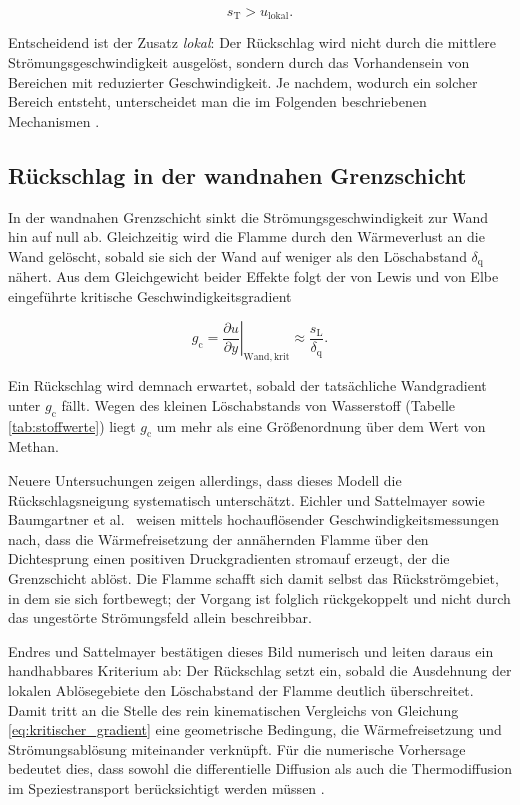 \begin{equation}
	\label{eq:flashback_bedingung}
	s_\mathrm{T} > u_\mathrm{lokal}.
\end{equation}

Entscheidend ist der Zusatz \emph{lokal}: Der Rückschlag wird nicht durch die
mittlere Strömungsgeschwindigkeit ausgelöst, sondern durch das Vorhandensein
von Bereichen mit reduzierter Geschwindigkeit. Je nachdem, wodurch ein solcher
Bereich entsteht, unterscheidet man die im Folgenden beschriebenen
Mechanismen \cite{Kalantari_2017, Lieuwen_2008}.

\subsection{Rückschlag in der wandnahen Grenzschicht}\label{subsec:blf}

In der wandnahen Grenzschicht sinkt die Strömungsgeschwindigkeit zur Wand hin
auf null ab. Gleichzeitig wird die Flamme durch den Wärmeverlust an die Wand
gelöscht, sobald sie sich der Wand auf weniger als den Löschabstand
$\delta_\mathrm{q}$ nähert. Aus dem Gleichgewicht beider Effekte folgt der von
Lewis und von Elbe eingeführte kritische Geschwindigkeitsgradient

\begin{equation}
	\label{eq:kritischer_gradient}
	g_\mathrm{c} = \left.\frac{\partial u}{\partial y}\right|_\mathrm{Wand,krit}
	\approx \frac{s_\mathrm{L}}{\delta_\mathrm{q}}.
\end{equation}

Ein Rückschlag wird demnach erwartet, sobald der tatsächliche Wandgradient
unter $g_\mathrm{c}$ fällt. Wegen des kleinen Löschabstands von Wasserstoff
(Tabelle \ref{tab:stoffwerte}) liegt $g_\mathrm{c}$ um mehr als eine
Größenordnung über dem Wert von Methan.

Neuere Untersuchungen zeigen allerdings, dass dieses Modell die
Rückschlagsneigung systematisch unterschätzt. Eichler und Sattelmayer
\cite{Eichler_2012} sowie Baumgartner et al.\ \cite{Baumgartner_2016} weisen
mittels hochauflösender Geschwindigkeitsmessungen nach, dass die
Wärmefreisetzung der annähernden Flamme über den Dichtesprung einen
positiven Druckgradienten stromauf erzeugt, der die Grenzschicht ablöst. Die
Flamme schafft sich damit selbst das Rückströmgebiet, in dem sie sich
fortbewegt; der Vorgang ist folglich rückgekoppelt und nicht durch das
ungestörte Strömungsfeld allein beschreibbar.

Endres und Sattelmayer \cite{Endres_2018} bestätigen dieses Bild numerisch und
leiten daraus ein handhabbares Kriterium ab: Der Rückschlag setzt ein, sobald
die Ausdehnung der lokalen Ablösegebiete den Löschabstand der Flamme deutlich
überschreitet. Damit tritt an die Stelle des rein kinematischen Vergleichs von
Gleichung \eqref{eq:kritischer_gradient} eine geometrische Bedingung, die
Wärmefreisetzung und Strömungsablösung miteinander verknüpft. Für die
numerische Vorhersage bedeutet dies, dass sowohl die differentielle Diffusion
als auch die Thermodiffusion im Speziestransport berücksichtigt werden
müssen \cite{Endres_2018}.

